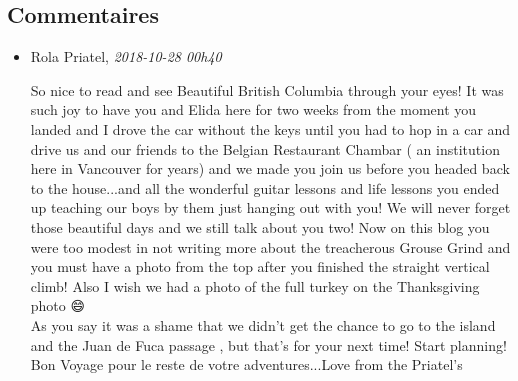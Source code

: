 \hypertarget{commentaires}{%
\subsection{Commentaires}\label{commentaires}}

\begin{itemize}
\item
  Rola Priatel, \emph{2018-10-28 00h40}

  So nice to read and see Beautiful British Columbia through your eyes!
  It was such joy to have you and Elida here for two weeks from the
  moment you landed and I drove the car without the keys until you had
  to hop in a car and drive us and our friends to the Belgian Restaurant
  Chambar ( an institution here in Vancouver for years) and we made you
  join us before you headed back to the house...and all the wonderful
  guitar lessons and life lessons you ended up teaching our boys by them
  just hanging out with you! We will never forget those beautiful days
  and we still talk about you two! Now on this blog you were too modest
  in not writing more about the treacherous Grouse Grind and you must
  have a photo from the top after you finished the straight vertical
  climb! Also I wish we had a photo of the full turkey on the
  Thanksgiving photo 😄\\
  As you say it was a shame that we didn't get the chance to go to the
  island and the Juan de Fuca passage , but that's for your next time!
  Start planning! Bon Voyage pour le reste de votre adventures...Love
  from the Priatel's
\end{itemize}
